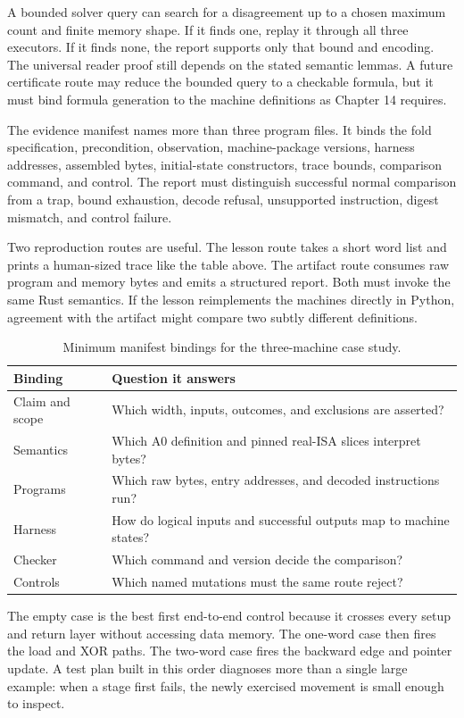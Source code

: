 A bounded solver query can search for a disagreement up to a chosen maximum
count and finite memory shape. If it finds one, replay it through all three
executors. If it finds none, the report supports only that bound and encoding.
The universal reader proof still depends on the stated semantic lemmas. A
future certificate route may reduce the bounded query to a checkable formula,
but it must bind formula generation to the machine definitions as Chapter 14
requires.

The evidence manifest names more than three program files. It binds the fold
specification, precondition, observation, machine-package versions, harness
addresses, assembled bytes, initial-state constructors, trace bounds,
comparison command, and control.
The report must distinguish successful normal comparison from a trap, bound
exhaustion, decode refusal, unsupported instruction, digest mismatch, and
control failure.

Two reproduction routes are useful. The lesson route takes a short word list
and prints a human-sized trace like the table above. The artifact route consumes
raw program and memory bytes and emits a structured report. Both must invoke
the same Rust semantics. If the lesson reimplements the machines directly in
Python, agreement with the artifact might compare two subtly different
definitions.

\begin{table}[htbp]
\centering
\caption{Minimum manifest bindings for the three-machine case study.}
\begin{tabular}{@{}p{}p{}@{}}
\toprule
Binding & Question it answers \\
\midrule
Claim and scope & Which width, inputs, outcomes, and exclusions are asserted? \\
Semantics & Which A0 definition and pinned real-ISA slices interpret bytes? \\
Programs & Which raw bytes, entry addresses, and decoded instructions run? \\
Harness & How do logical inputs and successful outputs map to machine states? \\
Checker & Which command and version decide the comparison? \\
Controls & Which named mutations must the same route reject? \\
\bottomrule
\end{tabular}
\end{table}

The empty case is the best first end-to-end control because it crosses every
setup and return layer without accessing data memory. The one-word case then
fires the load and XOR paths. The two-word case fires the backward edge and
pointer update. A test plan built in this order diagnoses more than a single
large example: when a stage first fails, the newly exercised movement is
small enough to inspect.

